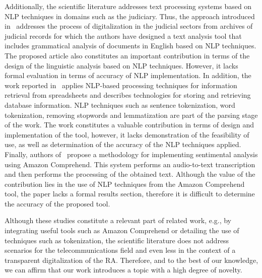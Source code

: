 Additionally, the scientific literature addresses text processing systems based on NLP techniques in domains such as the judiciary. Thus, the approach introduced in~\cite{8487847} addresses the process of digitalization in the judicial sectors from archives of judicial records for which the authors have designed a text analysis tool that includes grammatical analysis of documents in English based on NLP techniques. The proposed article also constitutes an important contribution in terms of the design of the linguistic analysis based on NLP techniques. However, it lacks formal evaluation in terms of accuracy of NLP implementation. In addition, the work reported in~\cite{9138070} applies NLP-based processing techniques for information retrieval from spreadsheets and describes technologies for storing and retrieving database information. NLP techniques such as sentence tokenization, word tokenization, removing stopwords and lemmatization are part of the parsing stage of the work. The work constitutes a valuable contribution in terms of design and implementation of the tool, however, it lacks demonstration of the feasibility of use, as well as determination of the accuracy of the NLP techniques applied. Finally, authors of~\cite{9104105} propose a methodology for implementing sentimental analysis using Amazon Comprehend. This system performs an audio-to-text transcription and then performs the processing of the obtained text. Although the value of the contribution lies in the use of NLP techniques from the Amazon Comprehend tool, the paper lacks a formal results section, therefore it is difficult to determine the accuracy of the proposed tool. 

Although these studies constitute a relevant part of related work, e.g., by integrating useful tools such as Amazon Comprehend or detailing the use of techniques such as tokenization, the scientific literature does not address scenarios for the telecommunications field and even less in the context of a transparent digitalization of the RA. Therefore, and to the best of our knowledge, we can affirm that our work introduces a topic with a high degree of novelty.